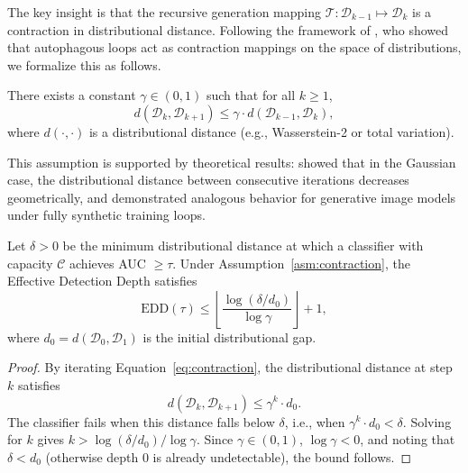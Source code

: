 The key insight is that the recursive generation mapping $\mathcal{T}: \mathcal{D}_{k-1} \mapsto \mathcal{D}_k$ is a contraction in distributional distance. Following the framework of \citet{alemohammad2024_mad}, who showed that autophagous loops act as contraction mappings on the space of distributions, we formalize this as follows.

\begin{assumption}
\label{asm:contraction}
There exists a constant $\gamma \in (0, 1)$ such that for all $k \geq 1$,
\begin{equation}
    d(\mathcal{D}_k, \mathcal{D}_{k+1}) \leq \gamma \cdot d(\mathcal{D}_{k-1}, \mathcal{D}_k),
    \label{eq:contraction}
\end{equation}
where $d(\cdot, \cdot)$ is a distributional distance (e.g., Wasserstein-2 or total variation).
\end{assumption}

This assumption is supported by theoretical results: \citet{shumailov2024_nature} showed that in the Gaussian case, the distributional distance between consecutive iterations decreases geometrically, and \citet{alemohammad2024_mad} demonstrated analogous behavior for generative image models under fully synthetic training loops.

\begin{theorem}
\label{thm:edd}
Let $\delta > 0$ be the minimum distributional distance at which a classifier with capacity $\mathcal{C}$ achieves AUC $\geq \tau$. Under Assumption~\ref{asm:contraction}, the Effective Detection Depth satisfies
\begin{equation}
    \text{EDD}(\tau) \leq \left\lfloor \frac{\log(\delta / d_0)}{\log \gamma} \right\rfloor + 1,
    \label{eq:edd_bound}
\end{equation}
where $d_0 = d(\mathcal{D}_0, \mathcal{D}_1)$ is the initial distributional gap.
\end{theorem}

\begin{proof}
By iterating Equation~\eqref{eq:contraction}, the distributional distance at step $k$ satisfies
\begin{equation}
    d(\mathcal{D}_k, \mathcal{D}_{k+1}) \leq \gamma^k \cdot d_0.
\end{equation}
The classifier fails when this distance falls below $\delta$, i.e., when $\gamma^k \cdot d_0 < \delta$. Solving for $k$ gives $k > \log(\delta / d_0) / \log \gamma$. Since $\gamma \in (0,1)$, $\log \gamma < 0$, and noting that $\delta < d_0$ (otherwise depth 0 is already undetectable), the bound follows.
\end{proof}

